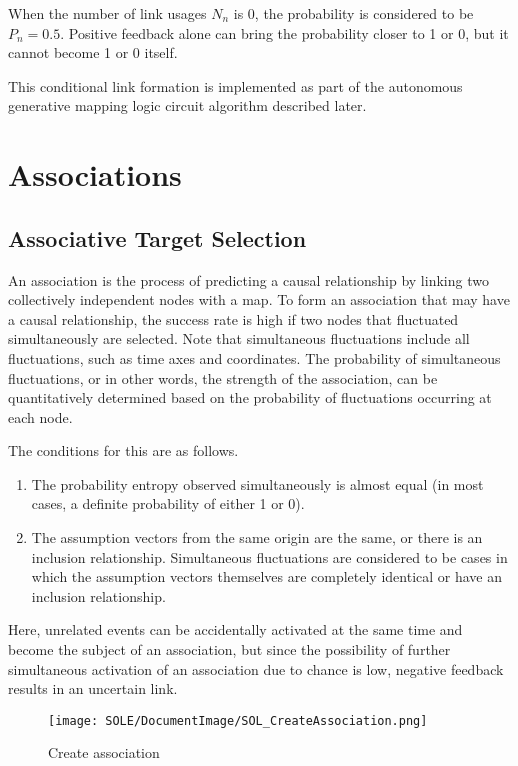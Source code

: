 \documentclass[12pt]{article}
\begin{document}
When the number of link usages \(N_n\) is 0, the probability is
considered to be \(P_n=0.5\). Positive feedback alone can bring the
probability closer to 1 or 0, but it cannot become 1 or 0 itself.

This conditional link formation is implemented as part of the autonomous
generative mapping logic circuit algorithm described later.

\section{Associations}\label{associations}

\subsection{Associative Target Selection}\label{associative-target-selection}

An association is the process of predicting a causal relationship by
linking two collectively independent nodes with a map. To form an
association that may have a causal relationship, the success rate is
high if two nodes that fluctuated simultaneously are selected. Note that
simultaneous fluctuations include all fluctuations, such as time axes
and coordinates. The probability of simultaneous fluctuations, or in
other words, the strength of the association, can be quantitatively
determined based on the probability of fluctuations occurring at each
node.

The conditions for this are as follows.

\begin{enumerate}
\def\labelenumi{\arabic{enumi}.}
\item
  The probability entropy observed simultaneously is almost equal (in
  most cases, a definite probability of either 1 or 0).
\item
  The assumption vectors from the same origin are the same, or there is
  an inclusion relationship. Simultaneous fluctuations are considered to
  be cases in which the assumption vectors themselves are completely
  identical or have an inclusion relationship.
\end{enumerate}

Here, unrelated events can be accidentally activated at the same time
and become the subject of an association, but since the possibility of
further simultaneous activation of an association due to chance is low,
negative feedback results in an uncertain link.

\begin{figure}[ht]
  \centering
  \texttt{[image: SOLE/DocumentImage/SOL\_CreateAssociation.png]}
  \caption{Create association}
  \label{fig:create_association}
\end{figure}
\end{document}
